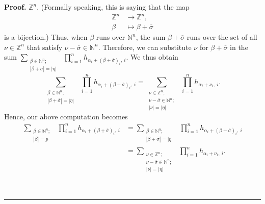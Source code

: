 \documentclass
[numbers=enddot,12pt,final,onecolumn,notitlepage,english]{scrartcl}%
\theoremstyle{definition}
\newenvironment{proof}[1][Proof]{\noindent\textbf{#1.} }{\ \rule{0.5em}{0.5em}}
\let\sumnonlimits\sum
\let\prodnonlimits\prod
\renewcommand{\sum}{\sumnonlimits\limits}
\renewcommand{\prod}{\prodnonlimits\limits}
\newenvironment{vershort}{}{}
\begin{document}
\begin{vershort}
\begin{proof}
$\mathbb{Z}^{n}$. (Formally speaking, this is saying that the map
\begin{align*}
\mathbb{Z}^{n}  &  \rightarrow\mathbb{Z}^{n},\\
\beta &  \mapsto\beta+\overline{\sigma}%
\end{align*}
is a bijection.) Thus, when $\beta$ runs over $\mathbb{N}^{n}$, the sum
$\beta+\overline{\sigma}$ runs over the set of all $\nu\in\mathbb{Z}^{n}$ that
satisfy $\nu-\overline{\sigma}\in\mathbb{N}^{n}$. Therefore, we can substitute
$\nu$ for $\beta+\overline{\sigma}$ in the sum $\sum_{\substack{\beta
\in\mathbb{N}^{n};\\\left\vert \beta+\overline{\sigma}\right\vert =\left\vert
\eta\right\vert }}\ \ \prod_{i=1}^{n}h_{\alpha_{i}+\left(  \beta
+\overline{\sigma}\right)  _{i},\ i}$. We thus obtain%
\[
\sum_{\substack{\beta\in\mathbb{N}^{n};\\\left\vert \beta+\overline{\sigma
}\right\vert =\left\vert \eta\right\vert }}\ \ \prod_{i=1}^{n}h_{\alpha
_{i}+\left(  \beta+\overline{\sigma}\right)  _{i},\ i}=\sum_{\substack{\nu
\in\mathbb{Z}^{n};\\\nu-\overline{\sigma}\in\mathbb{N}^{n};\\\left\vert
\nu\right\vert =\left\vert \eta\right\vert }}\ \ \prod_{i=1}^{n}h_{\alpha
_{i}+\nu_{i},\ i}.
\]
Hence, our above computation becomes%
\begin{align}
\sum_{\substack{\beta\in\mathbb{N}^{n};\\\left\vert \beta\right\vert
=p}}\ \ \prod_{i=1}^{n}h_{\alpha_{i}+\left(  \beta+\overline{\sigma}\right)
_{i},\ i}  &  =\sum_{\substack{\beta\in\mathbb{N}^{n};\\\left\vert
\beta+\overline{\sigma}\right\vert =\left\vert \eta\right\vert }%
}\ \ \prod_{i=1}^{n}h_{\alpha_{i}+\left(  \beta+\overline{\sigma}\right)
_{i},\ i}\nonumber\\
&  =\sum_{\substack{\nu\in\mathbb{Z}^{n};\\\nu-\overline{\sigma}\in
\mathbb{N}^{n};\\\left\vert \nu\right\vert =\left\vert \eta\right\vert
}}\ \ \prod_{i=1}^{n}h_{\alpha_{i}+\nu_{i},\ i}.
\label{pf.thm.pre-pieri.short.innersum}%
\end{align}



\end{proof}
\end{vershort}
\end{document}
